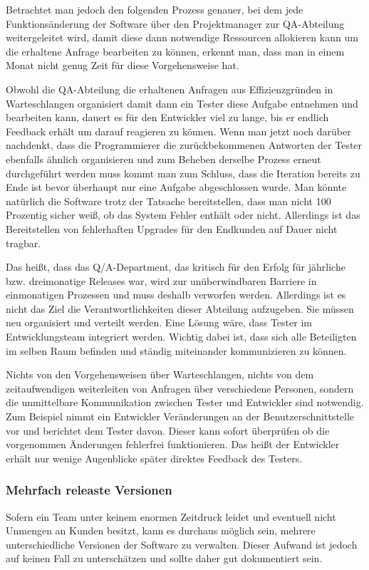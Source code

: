 Betrachtet man jedoch den folgenden Prozess genauer, bei dem jede
Funktionsänderung der Software über den Projektmanager zur QA-Abteilung
weitergeleitet wird, damit diese dann notwendige Ressourcen allokieren kann um
die erhaltene Anfrage bearbeiten zu können, erkennt man, dass man in einem
Monat nicht genug Zeit für diese Vorgehensweise hat.

Obwohl die QA-Abteilung die erhaltenen Anfragen aus Effizienzgründen in
Warteschlangen organisiert damit dann ein Tester diese Aufgabe entnehmen und
bearbeiten kann, dauert es für den Entwickler viel zu lange, bis er endlich
Feedback erhält um darauf reagieren zu können. Wenn man jetzt noch darüber
nachdenkt, dass die Programmierer die zurückbekommenen Antworten der Tester
ebenfalls ähnlich organisieren und zum Beheben derselbe Prozess erneut
durchgeführt werden muss kommt man zum Schluss, dass die Iteration bereits zu
Ende ist bevor überhaupt nur eine Aufgabe abgeschlossen wurde. Man könnte
natürlich die Software trotz der Tatsache bereitstellen, dass man nicht 100
Prozentig sicher weiß, ob das System Fehler enthält oder nicht. Allerdings ist
das Bereitstellen von fehlerhaften Upgrades für den Endkunden auf Dauer nicht
tragbar.

Das heißt, dass das Q/A-Department, das kritisch für den Erfolg für jährliche bzw. dreimonatige Releases war, wird zur unüberwindbaren Barriere in einmonatigen Prozessen und muss deshalb verworfen werden. Allerdings ist es nicht das Ziel die Verantwortlichkeiten dieser Abteilung aufzugeben. Sie müssen neu organisiert und verteilt werden.
Eine Lösung wäre, dass Tester im Entwicklungsteam integriert werden. Wichtig dabei ist, dass sich alle Beteiligten im selben Raum befinden und ständig miteinander kommunizieren zu können.

Nichts von den Vorgehensweisen über Warteschlangen, nichts von dem zeitaufwendigen weiterleiten von Anfragen über verschiedene Personen, sondern die unmittelbare Kommunikation zwischen Tester und Entwickler sind notwendig. Zum Beispiel nimmt ein Entwickler Veränderungen an der Benutzerschnittstelle vor und berichtet dem Tester davon. Dieser kann sofort überprüfen ob die vorgenommen Änderungen fehlerfrei funktionieren. Das heißt der Entwickler erhält nur wenige Augenblicke später direktes Feedback des Testers. 

\subsubsection{Mehrfach releaste Versionen}
Sofern ein Team unter keinem enormen Zeitdruck leidet und eventuell nicht Unmengen an Kunden besitzt, kann es durchaus möglich sein, mehrere unterschiedliche Versionen der Software zu verwalten. Dieser Aufwand ist jedoch auf keinen Fall zu unterschätzen und sollte daher gut dokumentiert sein.

